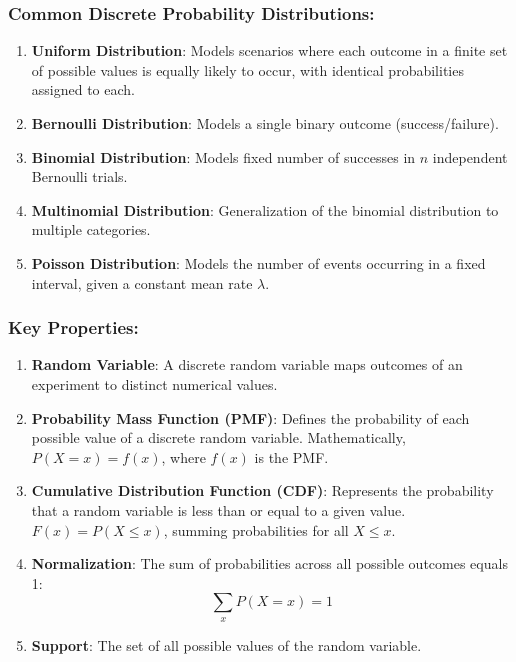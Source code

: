 \subsubsection*{Common Discrete Probability Distributions:}
\begin{enumerate}
    \item \textbf{Uniform Distribution}: Models scenarios where each outcome in a finite set of possible values is equally likely to occur, with identical probabilities assigned to each.
    \item \textbf{Bernoulli Distribution}: Models a single binary outcome (success/failure).
    \item \textbf{Binomial Distribution}: Models fixed number of successes in $n$ independent Bernoulli trials.
    \item \textbf{Multinomial Distribution}: Generalization of the binomial distribution to multiple categories.
    \item \textbf{Poisson Distribution}: Models the number of events occurring in a fixed interval, given a constant mean rate $\lambda$.
\end{enumerate}

\subsubsection*{Key Properties:}
\begin{enumerate}
    \item \textbf{Random Variable}: A discrete random variable maps outcomes of an experiment to distinct numerical values.
    \item \textbf{Probability Mass Function (PMF)}: Defines the probability of each possible value of a discrete random variable. Mathematically, $P(X = x) = f(x)$, where $f(x)$ is the PMF\@.
    \item \textbf{Cumulative Distribution Function (CDF)}: Represents the probability that a random variable is less than or equal to a given value. $F(x) = P(X \leq x)$, summing probabilities for all $X \leq x$.
    \item \textbf{Normalization}: The sum of probabilities across all possible outcomes equals 1:
    \[
        \sum_x P(X = x) = 1
    \]
    \item \textbf{Support}: The set of all possible values of the random variable.
\end{enumerate}

